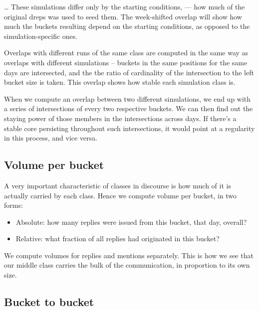 \documentclass[10pt,oneside]{memoir}
\begin{document}
{\ldots}
These simulations differ only by the starting conditions, --- how much of the original dreps was used to seed them.  The week-shifted overlap will show how much the buckets resulting depend on the starting conditions, as opposed to the simulation-specific ones.


Overlaps with different runs of the same class are computed in the same way as overlaps with different simulations -- buckets in the same positions for the same days are intersected, and the the ratio of cardinality of the intersection to the left bucket size is taken.  This overlap shows how stable each simulation class is.


When we compute an overlap between two different simulations, we end up with a series of intersections of every two respective buckets.  We can then find out the staying power of those members in the intersections across days.  If there's a stable core persisting throughout such intersections, it would point at a regularity in this process, and vice versa.


\pagebreak \subsection{Volume per bucket}
\label{volumeperbucket}

A very important characteristic of classes in discourse is how much of it is actually carried by each class.  Hence we compute volume per bucket, in two forms:


\begin{itemize}


\item Absolute: how many replies were issued from this bucket, that day, overall?

\item Relative: what fraction of all replies had originated in this bucket?
\end{itemize}

We compute volumes for replies and mentions separately.  This is how we see that our middle class carries the bulk of the communication, in proportion to its own size.  


\subsection{Bucket to bucket}
\label{buckettobucket}
\end{document}
